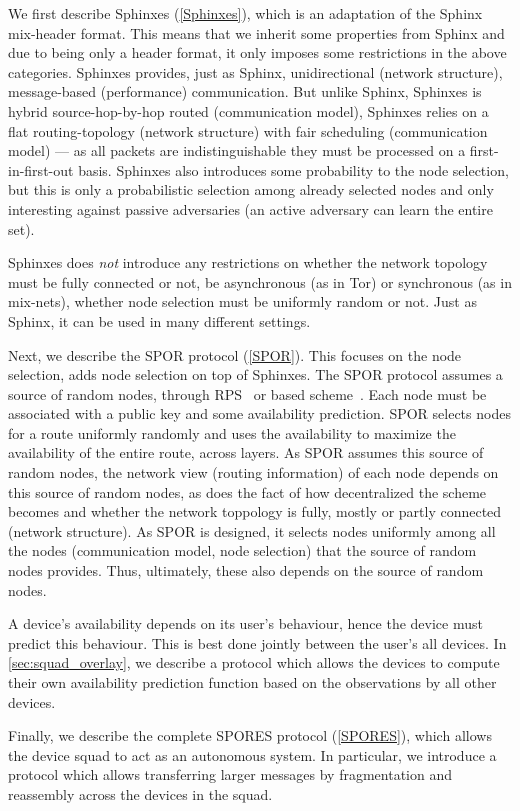 We first describe Sphinxes (\cref{Sphinxes}), which is an adaptation of the 
Sphinx~\cite{Sphinx} mix-header format.
This means that we inherit some properties from Sphinx and due to being only a 
header format, it only imposes some restrictions in the above categories.
Sphinxes provides, just as Sphinx, unidirectional (network structure), 
message-based (performance) communication.
But unlike Sphinx, Sphinxes is hybrid source-hop-by-hop routed (communication 
model),
Sphinxes relies on a flat routing-topology (network structure) with fair 
scheduling (communication model) --- as all packets are indistinguishable they 
must be processed on a first-in-first-out basis.
Sphinxes also introduces some probability to the node selection, but this is 
only a probabilistic selection among already selected nodes and only 
interesting against passive adversaries (an active adversary can learn the 
entire set).

Sphinxes does \emph{not} introduce any restrictions on whether the network 
topology must be fully connected or not, be asynchronous (as in Tor) or 
synchronous (as in mix-nets), whether node selection must be uniformly random 
or not.
Just as Sphinx, it can be used in many different settings.

Next, we describe the \ac{SPOR} protocol (\cref{SPOR}).
This focuses on the node selection, \ie adds node selection on top of Sphinxes.
The \ac{SPOR} protocol assumes a source of random nodes, \eg through 
\ac{RPS}~\cite[\eg][]{BrahmsRPS} or  based 
scheme~\cite[\eg][]{Octopus}.
Each node must be associated with a public key and some availability 
prediction.
\Ac{SPOR} selects nodes for a route uniformly randomly and uses the 
availability to maximize the availability of the entire route, \ie across 
layers.
As \ac{SPOR} assumes this source of random nodes, the network view (routing 
information) of each node depends on this source of random nodes, as does the 
fact of how decentralized the scheme becomes and whether the network toppology 
is fully, mostly or partly connected (network structure).
As \ac{SPOR} is designed, it selects nodes uniformly among all the nodes 
(communication model, node selection) that the source of random nodes provides.
Thus, ultimately, these also depends on the source of random nodes.

A device's availability depends on its user's behaviour, hence the device must 
predict this behaviour.
This is best done jointly between the user's all devices.
In \cref{sec:squad_overlay}, we describe a protocol which allows the devices to 
compute their own availability prediction function based on the observations by 
all other devices.

Finally, we describe the complete \ac{SPORES} protocol (\cref{SPORES}), which 
allows the device squad to act as an autonomous system.
In particular, we introduce a protocol which allows transferring larger 
messages by fragmentation and reassembly across the devices in the squad.






